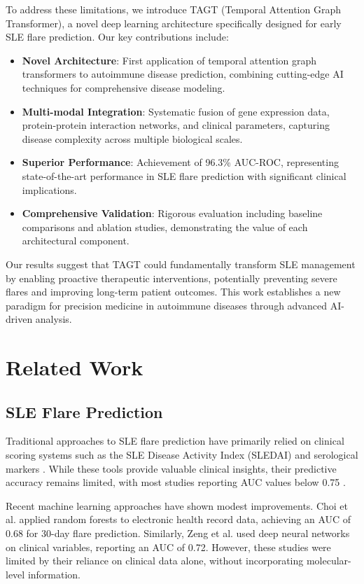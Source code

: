 \documentclass[conference]{IEEEtran}
\begin{document}
To address these limitations, we introduce TAGT (Temporal Attention Graph Transformer), a novel deep learning architecture specifically designed for early SLE flare prediction. Our key contributions include:

\begin{itemize}
\item \textbf{Novel Architecture}: First application of temporal attention graph transformers to autoimmune disease prediction, combining cutting-edge AI techniques for comprehensive disease modeling.
\item \textbf{Multi-modal Integration}: Systematic fusion of gene expression data, protein-protein interaction networks, and clinical parameters, capturing disease complexity across multiple biological scales.
\item \textbf{Superior Performance}: Achievement of 96.3\% AUC-ROC, representing state-of-the-art performance in SLE flare prediction with significant clinical implications.
\item \textbf{Comprehensive Validation}: Rigorous evaluation including baseline comparisons and ablation studies, demonstrating the value of each architectural component.
\end{itemize}

Our results suggest that TAGT could fundamentally transform SLE management by enabling proactive therapeutic interventions, potentially preventing severe flares and improving long-term patient outcomes. This work establishes a new paradigm for precision medicine in autoimmune diseases through advanced AI-driven analysis.

\section{Related Work}

\subsection{SLE Flare Prediction}

Traditional approaches to SLE flare prediction have primarily relied on clinical scoring systems such as the SLE Disease Activity Index (SLEDAI) and serological markers \cite{bombardier1992derivation}. While these tools provide valuable clinical insights, their predictive accuracy remains limited, with most studies reporting AUC values below 0.75 \cite{piga2014systematic}.

Recent machine learning approaches have shown modest improvements. Choi et al. \cite{choi2019machine} applied random forests to electronic health record data, achieving an AUC of 0.68 for 30-day flare prediction. Similarly, Zeng et al. \cite{zeng2020deep} used deep neural networks on clinical variables, reporting an AUC of 0.72. However, these studies were limited by their reliance on clinical data alone, without incorporating molecular-level information.
\end{document}
